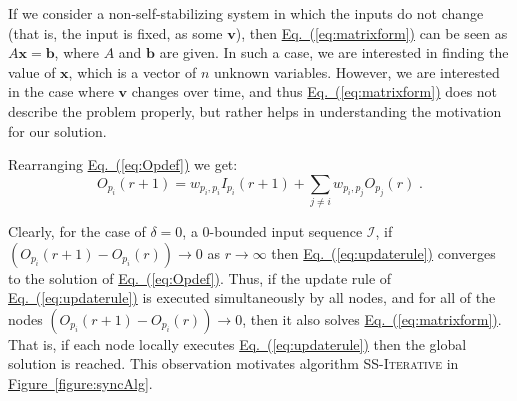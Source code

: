 \documentclass[preprint,12pt]{elsarticle}
\newcommand{\namedref}[2]{\hyperref[#2]{#1~\ref*{#2}}}
\newcommand{\figureref}[1]{\namedref{Figure}{#1}}
\newcommand{\namedrefeq}[2]{\hyperref[#2]{#1~\mbox{\rm(\ref*{#2})}}}
\newcommand{\equationref}[1]{\namedrefeq{Eq.}{#1}}
\newcommand{\syncAlg}{\textsc{SS-Iterative}\xspace}
\newcommand{\vv}{\mathbf{v}}
\newcommand{\xx}{\mathbf{x}}
\newcommand{\bb}{\mathbf{b}}
\newcommand{\II}[2]{I_{#1}(#2)}
\newcommand{\OO}[2]{O_{#1}(#2)}
\begin{document}
If we consider a non-self-stabilizing system in which the inputs
do not change (that is, the input is fixed, as some $\vv$), then
\equationref{eq:matrixform} can be seen as $A\xx=\bb$, where $A$
and $\bb$ are given. In such a case, we are interested in finding
the value of $\xx$, which is a vector of $n$ unknown variables.
However, we are interested in the case where $\vv$ changes over
time, and thus \equationref{eq:matrixform} does not describe the
problem properly, but rather helps in understanding the motivation
for our solution.

Rearranging \equationref{eq:Opdef} we get:
\begin{equation}\label{eq:updaterule}
  \OO{p_i}{r+1} =
  w_{p_i,p_i} \II{p_i}{r+1} + \sum_{j \neq i}w_{p_i, p_j}
   \OO{p_j}{r}\;.
\end{equation}

Clearly, for the case of $\delta=0$, a $0$-bounded input sequence
$\mathcal{I}$, if $(\OO{p_i}{r+1}-\OO{p_i}{r}) \longrightarrow 0$
as $r \rightarrow \infty$ then \equationref{eq:updaterule}
converges to the solution of \equationref{eq:Opdef}. Thus, if the
update rule of \equationref{eq:updaterule} is executed
simultaneously by all nodes, and for all of the nodes
$(\OO{p_i}{r+1}-\OO{p_i}{r}) \longrightarrow 0$, then it also
solves \equationref{eq:matrixform}. That is, if each node locally
executes \equationref{eq:updaterule} then the global solution is
reached. This observation motivates algorithm \syncAlg in
\figureref{figure:syncAlg}.
\end{document}
